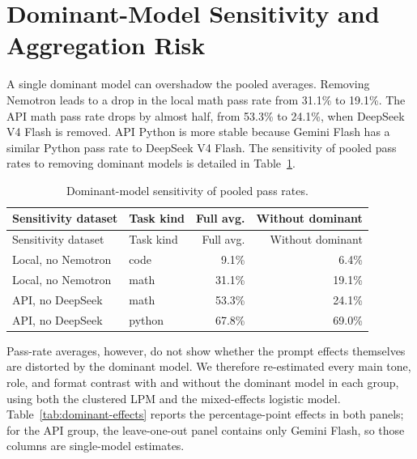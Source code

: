 \section{Dominant-Model Sensitivity and Aggregation Risk\label{sec:dominant-sensitivity}}

A single dominant model can overshadow the pooled averages. Removing Nemotron leads to a drop in the local math pass rate from 31.1\% to 19.1\%. The API math pass rate drops by almost half, from 53.3\% to 24.1\%, when DeepSeek V4 Flash is removed. API Python is more stable because Gemini Flash has a similar Python pass rate to DeepSeek V4 Flash. The sensitivity of pooled pass rates to removing dominant models is detailed in Table~\ref{tab:dominant-sensitivity}.

\begin{longtable}[]{@{}llrr@{}}
\caption{Dominant-model sensitivity of pooled pass rates.}\label{tab:dominant-sensitivity}\tabularnewline
\toprule\noalign{}
Sensitivity dataset & Task kind & Full avg. & Without dominant \\
\midrule\noalign{}
\endfirsthead
\toprule\noalign{}
Sensitivity dataset & Task kind & Full avg. & Without dominant \\
\midrule\noalign{}
\endhead
\bottomrule\noalign{}
\endlastfoot
Local, no Nemotron & code & 9.1\% & 6.4\% \\
Local, no Nemotron & math & 31.1\% & 19.1\% \\
API, no DeepSeek & math & 53.3\% & 24.1\% \\
API, no DeepSeek & python & 67.8\% & 69.0\% \\
\end{longtable}

Pass-rate averages, however, do not show whether the prompt effects themselves are distorted by the dominant model. We therefore re-estimated every main tone, role, and format contrast with and without the dominant model in each group, using both the clustered LPM and the mixed-effects logistic model. Table~\ref{tab:dominant-effects} reports the percentage-point effects in both panels; for the API group, the leave-one-out panel contains only Gemini Flash, so those columns are single-model estimates.

